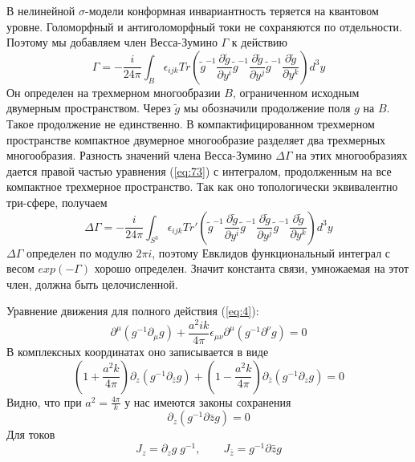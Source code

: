 \documentclass[a4paper,12pt]{article}
\theoremstyle{definition} \newtheorem{Def}{Definition}
\begin{document}
В нелинейной $\sigma$-модели конформная инвариантность теряется на квантовом уровне.
Голоморфный и антиголоморфный токи не сохраняются по отдельности.
Поэтому мы добавляем член Весса-Зумино $\Gamma$ к действию
\begin{equation}
  \label{eq:73}
\Gamma= - \frac{i }{24\pi} \int_{B}\epsilon_{ijk} Tr\left(
    \tilde g^{-1}\frac{\partial \tilde g}{\partial y^i}
      \tilde g^{-1}\frac{\partial \tilde g}{\partial y^j}
      \tilde g^{-1}\frac{\partial \tilde g}{\partial y^k}\right) d^3y
\end{equation}
Он определен на трехмерном многообразии $B$, ограниченном исходным двумерным пространством.
Через $\tilde{g}$ мы обозначили продолжение поля $g$ на $B$. Такое продолжение не единственно. В
компактифицированном трехмерном пространстве компактное двумерное многообразие разделяет два
трехмерных многообразия. Разность значений члена Весса-Зумино $\Delta\Gamma$ на этих многообразиях
дается правой частью уравнения (\ref{eq:73}) с интегралом, продолженным на все компактное трехмерное
пространство. Так как оно топологически эквивалентно три-сфере, получаем
\begin{equation}
  \label{eq:75} \Delta\Gamma= - \frac{i }{24\pi} \int_{S^3}\epsilon_{ijk} Tr'\left( \tilde
g^{-1}\frac{\partial \tilde g}{\partial y^i} \tilde g^{-1}\frac{\partial \tilde g}{\partial y^j}
\tilde g^{-1}\frac{\partial \tilde g}{\partial y^k}\right) d^3y
\end{equation}
$\Delta\Gamma$ определен по модулю $2\pi i$, поэтому Евклидов функциональный интеграл
с весом $exp(-\Gamma)$ хорошо определен. Значит константа связи, умножаемая на этот член, должна
быть целочисленной.

Уравнение движения для полного действия (\ref{eq:4}):
\begin{equation}
  \label{eq:77}
  \partial^{\mu}(g^{-1}\partial_{\mu}g)+\frac{a^2 ik}{4\pi}\epsilon_{\mu\nu}\partial^{\mu}(g^{-1}\partial^{\nu}g)=0
\end{equation}
В комплексных координатах оно записывается в виде
\begin{equation}
  \label{eq:78}
  (1+\frac{a^2 k}{4\pi})\partial_z(g^{-1}\partial_{\bar z}g)+(1-\frac{a^2 k}{4\pi})\partial_{\bar z}(g^{-1}\partial_z g)=0
\end{equation}
Видно, что при $a^2=\frac{4\pi}{k}$ у нас имеются законы сохранения
\begin{equation}
  \label{eq:79}
  \partial_z(g^{-1}\partial{\bar z}g)=0
\end{equation}
Для токов
\begin{equation}
  \label{eq:72}
  J_z=\partial_z g\;g^{-1}, \qquad J_{\bar{z}}=g^{-1}\partial{\bar z}g
\end{equation}
\end{document}
